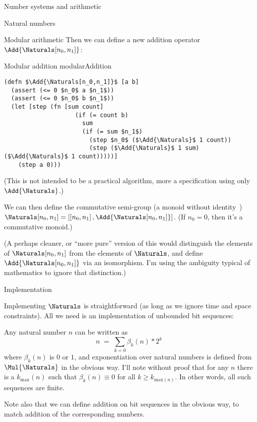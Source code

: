 \documentclass[12pt]{PalisadesLakesBook}
\begin{document}
\begin{plSection}{Number systems and arithmetic}
\begin{plSection}{Natural numbers}
\begin{plSection}{Modular arithmetic}
Then we can define a new addition operator 
$\Add{ \Naturals[n_0,n_1] }$:
\begin{plAlgorithm}
{Modular addition}
{modularAddition}
\begin{lstlisting}[language=pseudocode]
(defn $\Add{\Naturals[n_0,n_1]}$ [a b]
  (assert (<= 0 $n_0$ a $n_1$))
  (assert (<= 0 $n_0$ b $n_1$))
  (let [step (fn [sum count]
                    (if (= count b)
                      sum
                      (if (= sum $n_1$)
                        (step $n_0$ ($\Add{\Naturals}$ 1 count))
                        (step ($\Add{\Naturals}$ 1 sum) ($\Add{\Naturals}$ 1 count)))))]
    (step a 0)))
\end{lstlisting}
\end{plAlgorithm}
(\NOTE This is not intended to be a practical algorithm,
more a specification using only $\Add{\Naturals}$.)

We can then define the commutative semi-group 
(a monoid without identity~\cite{wiki:Semigroup})
$
\Naturals[n_0,n_1] =
\left[ 
\left[ n_{0}, n_{1} \right], 
\Add{\Naturals[n_0,n_1]}
\right]
$.
(If $n_0=0$, then it's a commutative monoid.)

(A perhaps cleaner, or ``more pure'' version of this
would distinguish the elements of $\Naturals[n_0,n_1]$
from the elements of $\Naturals$,
and define $\Add{\Naturals[n_0,n_1]}$ via an isomorphism.
I'm using the ambiguity typical of mathematics to ignore that
distinction.)

\end{plSection}%
\begin{plSection}{Implementation}

Implementing $\Naturals$ is straightforward 
(as long as we ignore time and space constraints).
All we need is an implementation of unbounded bit sequences:

Any natural number $n$ can be written as
\begin{equation}
n \; = \; \sum_{k=0} \beta_{k}(n) * 2^{k}
\end{equation}
where $\beta_{k}(n)$ is $0$ or $1$,
and exponentiation over natural numbers is defined from
$\Mul{\Naturals}$ in the obvious way.
I'll note without proof that for any $n$ there is a 
$k_{\text{max}}(n)$ such that $\beta_{k}(n) \equiv 0$ for all
$k \geq k_{\text{max}(n)}$.
In other words, all such sequences are finite. 

Note also that we can define addition on bit sequences in the
obvious way, to match addition of the corresponding numbers.


\end{plSection}
\end{plSection}
\end{plSection}
\end{document}
